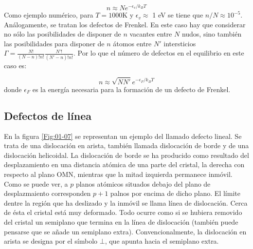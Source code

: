 \begin{equation}
    n \approx N e^{-\epsilon_v /k_B T}
\end{equation}
Como ejemplo numérico, para $T=1000$K y $\epsilon_v  \approx $ 1 eV se tiene que $n/N \approx 10^{-5}$. Análogamente, se tratan los defectos de Frenkel. En este caso hay que considerar no sólo las posibilidades de disponer de $n$ vacantes entre $N$ nudos, sino también las posibilidades para disponer de $n$ átomos entre $N'$ intersticios $\Gamma = \frac{N!}{(N-n)! n!}\frac{N'!}{(N'-n)! n!}$. Por lo que el número de defectos en el equilibrio en este caso es:

\begin{equation}
    n \approx \sqrt{NN'} e^{-\epsilon_F / k_B T}
\end{equation}
donde $\epsilon_F$ es la energía necesaria para la formación de un defecto de Frenkel.

\subsection{Defectos de línea}

En la figura \ref{Fig:01-07} se representan un ejemplo del llamado defecto lineal. Se trata de una dislocación en arista, también llamada dislocación de borde y de una dislocación helicoidal. La dislocación de borde se ha producido como resultado del desplazamiento en una distancia atómica de una parte del cristal, la derecha con respecto al plano OMN, mientras que la mitad izquierda permanece inmóvil. Como se puede ver, a $p$ planos atómicos situados debajo del plano de desplazmaiento corresponden $p+1$ palnos por encima de dicho plano. El límite dentre la región que ha deslizado y la inmóvil se llama línea de dislocación. Cerca de ésta el cristal está muy deformado. Todo ocurre como si se hubiera removido del cristal un semiplano que termina en la línea de dislocación (también puede pensarse que se añade un semiplano extra). Convencionalmente, la dislocación en arista se designa por el símbolo $\bot$, que apunta hacia el semiplano extra. 

